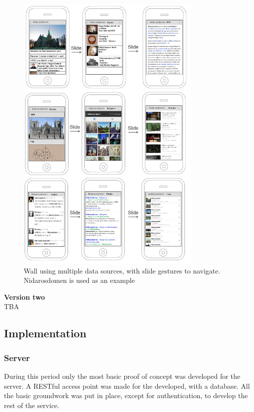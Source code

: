 \documentclass[11pt]{book}
\begin{document}
\begin{figure}[H]
      \centering
      \includegraphics[width=0.8\textwidth]{Figures/Phases/Sprint1/versiononeMultipleDataSourcesWall2.png}
      \caption{Wall using multiple data sources, with slide gestures to navigate. Nidarosdomen is used as an example}
      \label{fig:phases_sprint1_uiVersionOneMultipleDataSoruces}
\end{figure}

\textbf{Version two}\\
TBA

\subsection{Implementation}

\subsubsection{Server}
During this period only the most basic proof of concept was developed for the server. A RESTful access point was made for the developed, with a database. All the basic groundwork was put in place, except for authentication, to develop the rest of the service.
\end{document}
